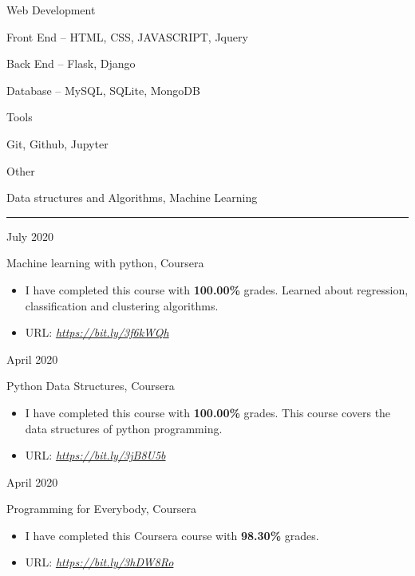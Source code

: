 \documentclass[a4paper,10pt]{article}
\newlength{\cvcolumngapwidth}
\newlength{\cvleftcolumnwidth}
\newlength{\cvrightcolumnwidth}
\newcommand{\cvsectionstyle}[1]{{\normalsize\cvsectionfont\textcolor{cvsectioncolor}{#1}}}
\newcommand{\cvtitlestyle}[1]{{\large\cvtitlefont\textcolor{cvtitlecolor}{#1}}}
\newcommand{\cvdurationstyle}[1]{{\small\cvdurationfont\textcolor{cvdurationcolor}{#1}}}
\newcommand{\cvheadingstyle}[1]{{\normalsize\cvheadingfont\textcolor{cvheadingcolor}{#1}}}
\newlength{\cvafteritemskipamount}
\newlength{\cvaftersectionskipamount}
\newlength{\cvaftertitleskipamount}
\newlength{\cvparskip}
\newcommand{\cvsection}[1]{
    \begin{minipage}[t]{\cvleftcolumnwidth}
        \raggedleft\cvsectionstyle{#1}
    \end{minipage}%
    \hspace{\cvcolumngapwidth}%
    \begin{minipage}[t]{\cvrightcolumnwidth}
        \textcolor{cvrulecolor}{\rule{\cvrightcolumnwidth}{0.3mm}}
    \end{minipage}

    \vspace{\cvaftersectionskipamount}
}
\newcommand{\cvitem}[2]{
    \begin{minipage}[t]{\cvleftcolumnwidth}
        \raggedleft #1
    \end{minipage}%
    \hspace{\cvcolumngapwidth}%
    \begin{minipage}[t]{\cvrightcolumnwidth}
        \setlength{\parskip}{\cvparskip} #2
    \end{minipage}

    \vspace{\cvafteritemskipamount}
}
\newcommand{\cvtitle}[1]{
    \cvtitlestyle{#1}

    \vspace{\cvaftertitleskipamount}
    \vspace{-\cvparskip}
}
\begin{document}
\cvitem{
    \cvheadingstyle{Web Development}
}{
    \item Front End -- HTML, CSS, JAVASCRIPT, Jquery
    \item Back End  -- Flask, Django
    \item Database  -- MySQL, SQLite, MongoDB 
}

\cvitem{
    \cvheadingstyle{Tools}
}{
    \item Git, Github, Jupyter
}
\cvitem{
    \cvheadingstyle{Other}
}{
    \item Data structures and Algorithms, Machine Learning
}

\cvsection{CERTIFICATIONS}

\cvitem{
    \cvdurationstyle{July 2020}
}{
    \cvtitle{Machine learning with python, Coursera}


    \begin{itemize}[leftmargin=*]
         \item I have completed this course with \textbf{100.00\%} grades. Learned about regression, classification and clustering algorithms.
        \item URL: 
        \textit{\href{https://www.coursera.org/account/accomplishments/certificate/T4ZNVF93GQF8}{https://bit.ly/3f6kWQh}}
    \end{itemize}
}

\cvitem{
    \cvdurationstyle{April 2020}
}{
    \cvtitle{Python Data Structures, Coursera}


    \begin{itemize}[leftmargin=*]
         \item I have completed this course with \textbf{100.00\%} grades. This course covers the data structures of
         python programming.
        \item URL:
       \textit{\href{https://www.coursera.org/account/accomplishments/certificate/AKZ5LTN9JV5L}{https://bit.ly/3jB8U5b}}
    \end{itemize}
}


\cvitem{
    \cvdurationstyle{April 2020}
}{
    \cvtitle{Programming for Everybody, Coursera}


    \begin{itemize}[leftmargin=*]
         \item I have completed this Coursera course with \textbf{98.30\%} grades.
        \item URL:
        \textit{\href{https://www.coursera.org/account/accomplishments/certificate/7APPEQDNGXJX}{https://bit.ly/3hDW8Ro}}
        
    \end{itemize}
}
\end{document}
